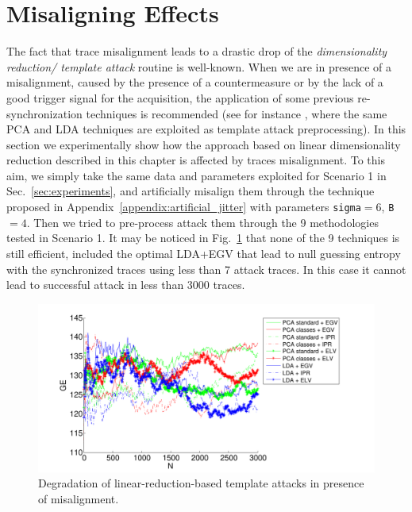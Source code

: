 \section{Misaligning Effects}\label{sec:misalignment}
The fact that trace misalignment leads to a drastic drop of the \emph{dimensionality reduction/ template attack} routine is well-known. When we are in presence of a misalignment, caused by the presence of a countermeasure or  by the lack of a good trigger signal for the acquisition, the application of some previous re-synchronization techniques is recommended (see for instance \cite{choudary2014template}, where the same PCA and LDA techniques are exploited as template attack preprocessing). In this section we experimentally show how the approach based on linear dimensionality reduction described in this chapter is affected by traces misalignment. To this aim, we simply take the same data and parameters exploited for Scenario 1 in Sec.~\ref{sec:experiments}, and artificially misalign them through the technique proposed in Appendix~\ref{appendix:artificial_jitter} with parameters \texttt{sigma}$= 6$, \texttt{B}$= 4$. Then we tried to pre-process attack them through the 9 methodologies tested in Scenario 1. It may be noticed in Fig.~\ref{fig:PCA_LDA_misalignment} that none of the 9 techniques is still efficient, included the optimal LDA+EGV that lead to null guessing entropy with the synchronized traces using less than 7 attack traces. In this case it cannot lead to successful attack in less than 3000 traces.
\begin{figure}
\includegraphics[width=\textwidth]{../Figures/desynchro_results_PCA_LDA.pdf} 
\caption{Degradation of linear-reduction-based template attacks in presence of misalignment.}\label{fig:PCA_LDA_misalignment}
\end{figure}